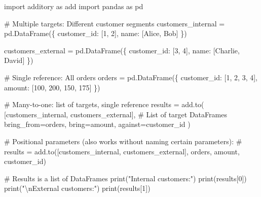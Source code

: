 \documentclass[
  letterpaper,
]{scrbook}
\newenvironment{Shaded}{\begin{snugshade}}{\end{snugshade}}
\newcommand{\BuiltInTok}[1]{\textcolor[rgb]{0.00,0.23,0.31}{#1}}
\newcommand{\CharTok}[1]{\textcolor[rgb]{0.13,0.47,0.30}{#1}}
\newcommand{\CommentTok}[1]{\textcolor[rgb]{0.37,0.37,0.37}{#1}}
\newcommand{\DecValTok}[1]{\textcolor[rgb]{0.68,0.00,0.00}{#1}}
\newcommand{\ImportTok}[1]{\textcolor[rgb]{0.00,0.46,0.62}{#1}}
\newcommand{\NormalTok}[1]{\textcolor[rgb]{0.00,0.23,0.31}{#1}}
\newcommand{\OperatorTok}[1]{\textcolor[rgb]{0.37,0.37,0.37}{#1}}
\newcommand{\StringTok}[1]{\textcolor[rgb]{0.13,0.47,0.30}{#1}}
\begin{document}
\begin{Shaded}
\begin{Highlighting}[]
\ImportTok{import}\NormalTok{ additory }\ImportTok{as}\NormalTok{ add}
\ImportTok{import}\NormalTok{ pandas }\ImportTok{as}\NormalTok{ pd}

\CommentTok{\# Multiple targets: Different customer segments}
\NormalTok{customers\_internal }\OperatorTok{=}\NormalTok{ pd.DataFrame(\{}
    \StringTok{\textquotesingle{}customer\_id\textquotesingle{}}\NormalTok{: [}\DecValTok{1}\NormalTok{, }\DecValTok{2}\NormalTok{],}
    \StringTok{\textquotesingle{}name\textquotesingle{}}\NormalTok{: [}\StringTok{\textquotesingle{}Alice\textquotesingle{}}\NormalTok{, }\StringTok{\textquotesingle{}Bob\textquotesingle{}}\NormalTok{]}
\NormalTok{\})}

\NormalTok{customers\_external }\OperatorTok{=}\NormalTok{ pd.DataFrame(\{}
    \StringTok{\textquotesingle{}customer\_id\textquotesingle{}}\NormalTok{: [}\DecValTok{3}\NormalTok{, }\DecValTok{4}\NormalTok{],}
    \StringTok{\textquotesingle{}name\textquotesingle{}}\NormalTok{: [}\StringTok{\textquotesingle{}Charlie\textquotesingle{}}\NormalTok{, }\StringTok{\textquotesingle{}David\textquotesingle{}}\NormalTok{]}
\NormalTok{\})}

\CommentTok{\# Single reference: All orders}
\NormalTok{orders }\OperatorTok{=}\NormalTok{ pd.DataFrame(\{}
    \StringTok{\textquotesingle{}customer\_id\textquotesingle{}}\NormalTok{: [}\DecValTok{1}\NormalTok{, }\DecValTok{2}\NormalTok{, }\DecValTok{3}\NormalTok{, }\DecValTok{4}\NormalTok{],}
    \StringTok{\textquotesingle{}amount\textquotesingle{}}\NormalTok{: [}\DecValTok{100}\NormalTok{, }\DecValTok{200}\NormalTok{, }\DecValTok{150}\NormalTok{, }\DecValTok{175}\NormalTok{]}
\NormalTok{\})}

\CommentTok{\# Many{-}to{-}one: list of targets, single reference}
\NormalTok{results }\OperatorTok{=}\NormalTok{ add.to(}
\NormalTok{    [customers\_internal, customers\_external],    }\CommentTok{\# List of target DataFrames}
\NormalTok{    bring\_from}\OperatorTok{=}\NormalTok{orders,}
\NormalTok{    bring}\OperatorTok{=}\StringTok{\textquotesingle{}amount\textquotesingle{}}\NormalTok{,}
\NormalTok{    against}\OperatorTok{=}\StringTok{\textquotesingle{}customer\_id\textquotesingle{}}
\NormalTok{)}

\CommentTok{\# Positional parameters (also works without naming certain parameters):}
\CommentTok{\# results = add.to([customers\_internal, customers\_external], orders, \textquotesingle{}amount\textquotesingle{}, \textquotesingle{}customer\_id\textquotesingle{})}

\CommentTok{\# Results is a list of DataFrames}
\BuiltInTok{print}\NormalTok{(}\StringTok{"Internal customers:"}\NormalTok{)}
\BuiltInTok{print}\NormalTok{(results[}\DecValTok{0}\NormalTok{])}
\BuiltInTok{print}\NormalTok{(}\StringTok{"}\CharTok{\textbackslash{}n}\StringTok{External customers:"}\NormalTok{)}
\BuiltInTok{print}\NormalTok{(results[}\DecValTok{1}\NormalTok{])}
\end{Highlighting}
\end{Shaded}
\end{document}
